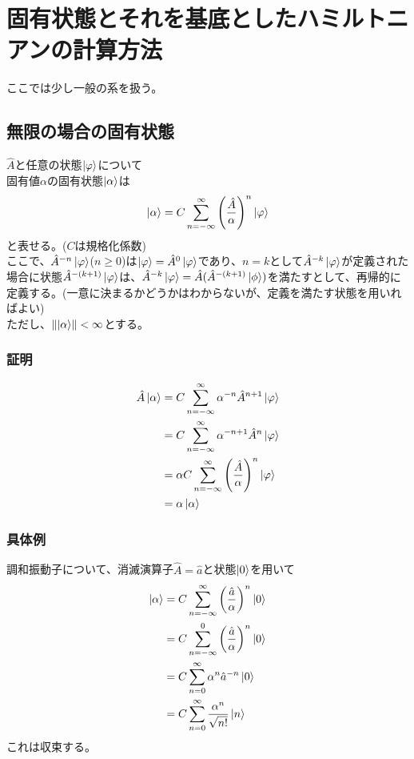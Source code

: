 \documentclass{ltjsarticle}
\begin{document}
\section{固有状態とそれを基底としたハミルトニアンの計算方法}
ここでは少し一般の系を扱う。
\subsection{無限の場合の固有状態}
$\hat{A}$と任意の状態$\ket{\varphi}$について\\
固有値$\alpha$の固有状態$\ket{\alpha}$は
\begin{align}
  \ket{\alpha}=C\sum_{n=-\infty}^{\infty} \left(\frac{\hat{A}}{\alpha} \right)^n \ket{\varphi}
\end{align}
と表せる。($C$は規格化係数)\\
ここで、$\hat{A}^{-n}\ket{\varphi}$($n\ge0$)は$\ket{\varphi}=\hat{A}^0\ket{\varphi}$であり、$n=k$として$\hat{A}^{-k}\ket{\varphi}$が定義された場合に状態$\hat{A}^{-(k+1)}\ket{\varphi}$は、$\hat{A}^{-k}\ket{\varphi}=\hat{A}(\hat{A}^{-(k+1)}\ket{\phi})$を満たすとして、再帰的に定義する。(一意に決まるかどうかはわからないが、定義を満たす状態を用いればよい)\\
ただし、$\norm{\ket{\alpha}}<\infty$とする。\\
\subsubsection*{証明}
\begin{align}
  \hat{A}\ket{\alpha} &= C\sum_{n=-\infty}^{\infty} \alpha^{-n} \hat{A}^{n+1} \ket{\varphi}\\
  &= C\sum_{n=-\infty}^{\infty} \alpha^{-n+1} \hat{A}^{n} \ket{\varphi}\\
  &= \alpha C\sum_{n=-\infty}^{\infty} \left(\frac{\hat{A}}{\alpha} \right)^{n} \ket{\varphi}\\
  &= \alpha \ket{\alpha}
\end{align}
\subsubsection*{具体例}
調和振動子について、消滅演算子$\hat{A}=\hat{a}$と状態$\ket{0}$を用いて
\begin{align}
  \ket{\alpha} &= C\sum_{n=-\infty}^{\infty} \left(\frac{\hat{a}}{\alpha} \right)^n \ket{0}\\
  &= C\sum_{n=-\infty}^{0} \left(\frac{\hat{a}}{\alpha} \right)^n \ket{0}\\
  &= C\sum_{n=0}^{\infty} \alpha^n{\hat{a}}^{-n} \ket{0}\\
  &= C\sum_{n=0}^{\infty} \frac{\alpha^n }{\sqrt{n!}}\ket{n}\\
\end{align}
これは収束する。
\end{document}
